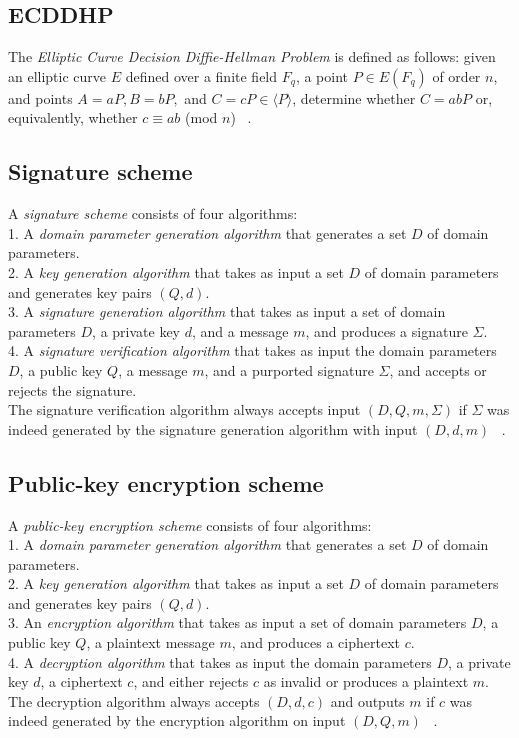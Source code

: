 \documentclass[11pt]{article}
\begin{document}
\subsection{ECDDHP} \label{ECDDHP}
The \emph{Elliptic Curve Decision Diffie-Hellman Problem} is defined as follows: 
given an elliptic curve $E$ defined over a finite field $F_q$, 
a point $P \in E(F_q)$ of order $n$, and points $A = aP, B = bP,$ and $C = cP \in \langle P \rangle$, 
determine whether $C = abP$ or, equivalently, whether $c \equiv ab$ (mod $n$) ~\cite{hankerson2003guide}.

\subsection{Signature scheme} \label{Signature scheme}
A \emph{signature scheme} consists of four algorithms:\\
1. A \emph{domain parameter generation algorithm} that generates a set $D$ of domain parameters.\\
2. A \emph{key generation algorithm} that takes as input a set $D$ of domain parameters and generates key pairs $(Q,d)$.\\
3. A \emph{signature generation algorithm} that takes as input a set of domain parameters $D$, a private key $d$, and a message $m$, and produces a signature $\Sigma$.\\
4. A \emph{signature verification algorithm} that takes as input the domain parameters $D$, a public key $Q$, a message $m$, and a purported signature $\Sigma$, and accepts or rejects the signature.\\
The signature verification algorithm always accepts input $(D,Q,m,\Sigma)$ if $\Sigma$ was indeed generated by the signature generation algorithm with input $(D,d,m)$ ~\cite{hankerson2003guide}.

\subsection{Public-key encryption scheme} \label{Public-key encryption scheme}
A \emph{public-key encryption scheme} consists of four algorithms:\\
1. A \emph{domain parameter generation algorithm} that generates a set $D$ of domain parameters.\\
2. A \emph{key generation algorithm} that takes as input a set $D$ of domain parameters and generates key pairs $(Q,d)$.\\
3. An \emph{encryption algorithm} that takes as input a set of domain parameters $D$, a public key $Q$, a plaintext message $m$, and produces a ciphertext $c$.\\
4. A \emph{decryption algorithm} that takes as input the domain parameters $D$, a private key $d$, a ciphertext $c$, and either rejects $c$ as invalid or produces a plaintext $m$.\\
The decryption algorithm always accepts $(D,d,c)$ and outputs $m$ if $c$ was indeed generated by the encryption algorithm on input $(D,Q,m)$ ~\cite{hankerson2003guide}.\\
\end{document}
